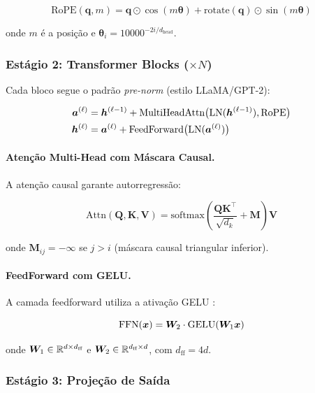 \begin{equation}
    \text{RoPE}(\bm{q}, m) = \bm{q} \odot \cos(m\bm{\theta}) + \text{rotate}(\bm{q}) \odot \sin(m\bm{\theta})
\end{equation}

onde $m$ \'e a posi\c{c}\~ao e $\bm{\theta}_i = 10000^{-2i/d_{\text{head}}}$.

\subsubsection{Est\'agio 2: Transformer Blocks ($\times N$)}

Cada bloco segue o padr\~ao \textit{pre-norm} (estilo LLaMA/GPT-2):

\begin{align}
    \bm{a}^{(\ell)} &= \bm{h}^{(\ell-1)} + \text{MultiHeadAttn}\big(\text{LN}(\bm{h}^{(\ell-1)}), \text{RoPE}\big) \label{eq:attn} \\
    \bm{h}^{(\ell)} &= \bm{a}^{(\ell)} + \text{FeedForward}\big(\text{LN}(\bm{a}^{(\ell)})\big) \label{eq:ffn}
\end{align}

\paragraph{Aten\c{c}\~ao Multi-Head com M\'ascara Causal.}
A aten\c{c}\~ao causal garante autorregress\~ao:

\begin{equation}
    \text{Attn}(\bm{Q}, \bm{K}, \bm{V}) = \text{softmax}\left(\frac{\bm{Q}\bm{K}^\top}{\sqrt{d_k}} + \bm{M}\right)\bm{V}
\end{equation}

onde $\bm{M}_{ij} = -\infty$ se $j > i$ (m\'ascara causal triangular inferior).

\paragraph{FeedForward com GELU.}
A camada feedforward utiliza a ativa\c{c}\~ao GELU \cite{hendrycks2016gelu}:

\begin{equation}
    \text{FFN}(\bm{x}) = \bm{W}_2 \cdot \text{GELU}(\bm{W}_1 \bm{x})
\end{equation}

onde $\bm{W}_1 \in \mathbb{R}^{d \times d_{\text{ff}}}$ e
$\bm{W}_2 \in \mathbb{R}^{d_{\text{ff}} \times d}$, com $d_{\text{ff}} = 4d$.

\subsubsection{Est\'agio 3: Proje\c{c}\~ao de Sa\'ida}


